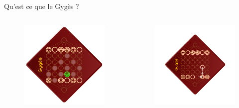 \documentclass{beamer}
\begin{document}
\begin{frame}{Qu’est ce que le Gygès ?}
\begin{columns}
{{						\only<5> {
							\begin{figure}[h!]
								\centering
								\includegraphics[width=\textwidth]{images/move3.png}
							\end{figure}
						}
					} {
						\alt<7> {
							\begin{figure}[h!]
								\centering
								\includegraphics[width=\textwidth]{images/rebond.png}

\end{figure}}}}
\end{columns}
\end{frame}
\end{document}
